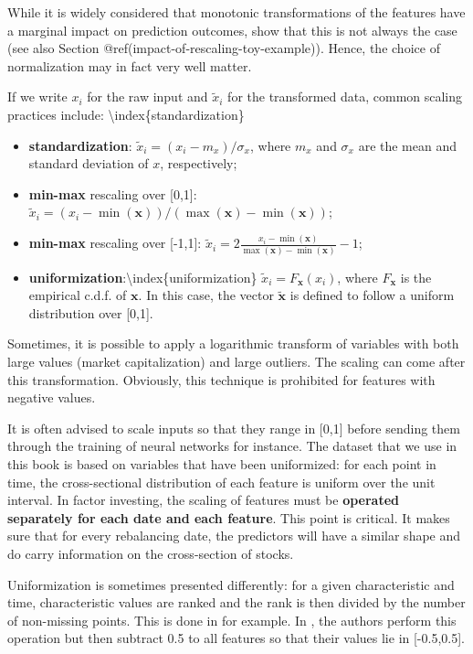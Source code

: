 While it is widely considered that monotonic transformations of the features have a marginal impact on prediction outcomes, \cite{galili2016splitting} show that this is not always the case (see also Section @ref(impact-of-rescaling-toy-example)). Hence, the choice of normalization may in fact very well matter.

If we write $x_i$ for the raw input and $\tilde{x}_i$ for the transformed data, common scaling practices include: {\textbackslash}index\{standardization\}

\begin{itemize}
\item \textbf{standardization}: $\tilde{x}_i=(x_i -m_x)/\sigma_x$, where $m_x$ and $\sigma_x$ are the mean and standard deviation of $x$, respectively;
\item \textbf{min-max} rescaling over [0,1]: $\tilde{x}_i=(x_i -\min(\mathbf{x}))/(\max(\mathbf{x}) -\min(\mathbf{x}))$;
\item \textbf{min-max} rescaling over [-1,1]: $\tilde{x}_i=2\frac{x_i -\min(\mathbf{x})}{\max(\mathbf{x}) -\min(\mathbf{x})} -1$;
\item \textbf{uniformization}:{\textbackslash}index\{uniformization\} $\tilde{x}_i=F_\mathbf{x}(x_i)$, where $F_\mathbf{x}$ is the empirical c.d.f. of $\mathbf{x}$. In this case, the vector $\tilde{\mathbf{x}}$ is defined to follow a uniform distribution over [0,1].
\end{itemize}

Sometimes, it is possible to apply a logarithmic transform of variables with both large values (market capitalization) and large outliers. The scaling can come after this transformation. Obviously, this technique is prohibited for features with negative values.

It is often advised to scale inputs so that they range in [0,1] before sending them through the training of neural networks for instance. The dataset that we use in this book is based on variables that have been uniformized: for each point in time, the cross-sectional distribution of each feature is uniform over the unit interval. In factor investing, the scaling of features must be \textbf{operated separately for each date and each feature}. This point is critical. It makes sure that for every rebalancing date, the predictors will have a similar shape and do carry information on the cross-section of stocks.

Uniformization is sometimes presented differently: for a given characteristic and time, characteristic values are ranked and the rank is then divided by the number of non-missing points. This is done in \cite{freyberger2020dissecting} for example. In \cite{kelly2019characteristics}, the authors perform this operation but then subtract 0.5 to all features so that their values lie in [-0.5,0.5].

